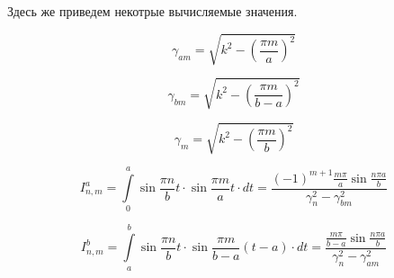 Здесь же приведем некотрые вычисляемые значения.

$$
	\gamma_{am} = \sqrt{k^2 - \left(\frac{\pi m}{a}\right)^2}
$$

$$
	\gamma_{bm} = \sqrt{k^2 - \left(\frac{\pi m}{b-a}\right)^2}
$$

$$
	\gamma_{m} = \sqrt{k^2 - \left(\frac{\pi m}{b}\right)^2}
$$

$$
	I^a_{n,m} = \int\limits_0^a\sin{\frac{\pi n}{b}t} \cdot \sin{\frac{\pi m}{a}t} \cdot dt = \frac{(-1)^{m+1}\frac{m \pi}{a} \sin{\frac{n \pi a}{b}}}{\gamma^2_n - \gamma^2_{bm}}
$$

$$
	I^b_{n,m} = \int\limits_a^b\sin{\frac{\pi n}{b}t} \cdot \sin{\frac{\pi m}{b-a}(t-a)} \cdot dt = \frac{\frac{m \pi}{b-a} \sin{\frac{n \pi a}{b}}}{\gamma^2_n - \gamma^2_{am}}
$$